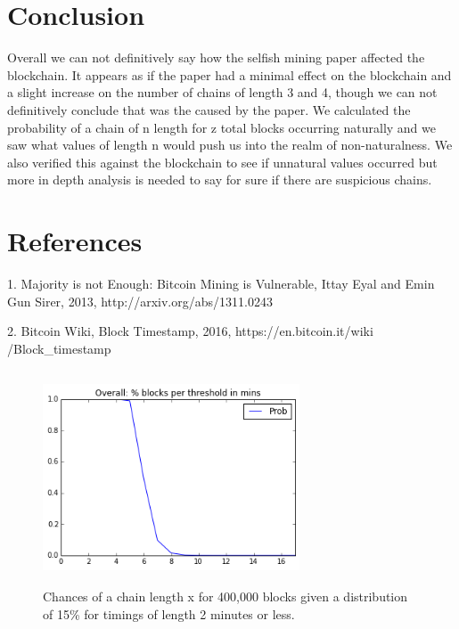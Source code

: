 \documentclass{sig-alternate-05-2015}
\begin{document}
\section{Conclusion}
Overall we can not definitively say how the selfish mining paper affected the blockchain. It appears as if the paper had a minimal effect on the blockchain and a slight increase on the number of chains of length 3 and 4, though we can not definitively conclude that was the caused by the paper. We calculated the probability of a chain of n length for z total blocks occurring naturally and we saw what values of length n would push us into the realm of non-naturalness. We also verified this against the blockchain to see if unnatural values occurred but more in depth analysis is needed to say for sure if there are suspicious chains.   

\section{References}
1. Majority is not Enough: Bitcoin Mining is Vulnerable, Ittay Eyal and Emin Gun Sirer, 2013, http://arxiv.org/abs/1311.0243 

2. Bitcoin Wiki, Block Timestamp, 2016, https://en.bitcoin.it/wiki
/Block\_timestamp

\begin{figure}
	\centering
	\includegraphics[height=2.5in, width=3in]{probability.png}
	\caption{ Chances of a chain length x for 400,000 blocks given a distribution of 15\% for timings of length 2 minutes or less.}
\end{figure} 
\end{document}
